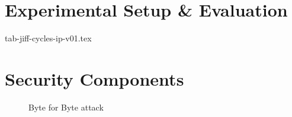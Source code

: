 \chapter{Experimental Setup \& Evaluation}
\label{chap:exp-setup-eavluation}

tab-jiff-cycles-ip-v01.tex


\chapter{Security Components}
\label{chap:sec-components}


\begin{figure}[H]
	\centering
	
	\caption{Byte for Byte attack} \label{fig:byte-for-byte}
\end{figure}